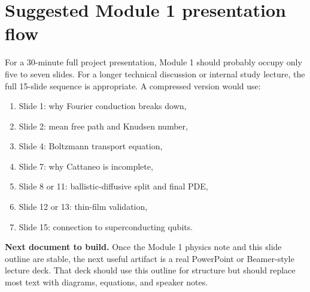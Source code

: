\documentclass[11pt]{article}
\begin{document}
\section{Suggested Module 1 presentation flow}
For a 30-minute full project presentation, Module 1 should probably occupy only five to seven slides. For a longer technical discussion or internal study lecture, the full 15-slide sequence is appropriate. A compressed version would use:
\begin{enumerate}[leftmargin=1.6em]
    \item Slide 1: why Fourier conduction breaks down,
    \item Slide 2: mean free path and Knudsen number,
    \item Slide 4: Boltzmann transport equation,
    \item Slide 7: why Cattaneo is incomplete,
    \item Slide 8 or 11: ballistic-diffusive split and final PDE,
    \item Slide 12 or 13: thin-film validation,
    \item Slide 15: connection to superconducting qubits.
\end{enumerate}

\begin{notebox}
\textbf{Next document to build.} Once the Module 1 physics note and this slide outline are stable, the next useful artifact is a real PowerPoint or Beamer-style lecture deck. That deck should use this outline for structure but should replace most text with diagrams, equations, and speaker notes.
\end{notebox}
\end{document}
